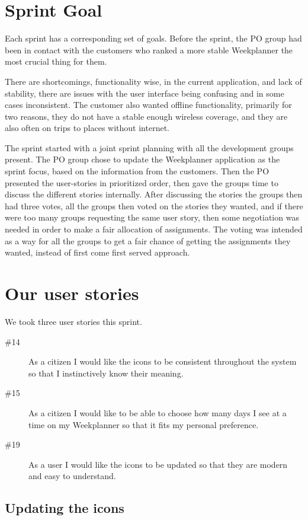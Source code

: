 \section{Sprint Goal}

Each sprint has a corresponding set of goals. Before the sprint, the \gls{PO} group had been in contact with the customers who ranked a more stable Weekplanner the most crucial thing for them.

There are shortcomings, functionality wise, in the current application, and lack of stability, there are issues with the user interface being confusing and in some cases inconsistent. The customer also wanted offline functionality, primarily for two reasons, they do not have a stable enough wireless coverage, and they are also often on trips to places without internet.

The sprint started with a joint sprint planning with all the development groups present. The \gls{PO} group chose to update the Weekplanner application as the sprint focus, based on the information from the customers. Then the \gls{PO} presented the user-stories in prioritized order, then gave the groups time to discuss the different stories internally. After discussing the stories the groups then had three votes, all the groups then voted on the stories they wanted, and if there were too many groups requesting the same user story, then some negotiation was needed in order to make a fair allocation of assignments. The voting was intended as a way for all the groups to get a fair chance of getting the assignments they wanted, instead of first come first served approach.

\section{Our user stories}
We took three user stories this sprint.
\begin{description}
    \item [\#14] As a citizen I would like the icons to be consistent throughout the system so that I instinctively know their meaning.
    \item [\#15] As a citizen I would like to be able to choose how many days I see at a time on my Weekplanner so that it fits my personal preference.
    \item [\#19] As a user I would like the icons to be updated so that they are modern and easy to understand.
\end{description}

\subsection{Updating the icons}

